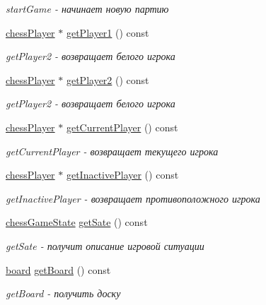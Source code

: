 \begin{DoxyCompactItemize}
\begin{DoxyCompactList}\small\item\em start\+Game -\/ начинает новую партию \end{DoxyCompactList}\item 
\hyperlink{classchess_player}{chess\+Player} $\ast$ \hyperlink{classchess_game_ae818720664a4aaaad9654c63ee138c39}{get\+Player1} () const 
\begin{DoxyCompactList}\small\item\em get\+Player2 -\/ возвращает белого игрока \end{DoxyCompactList}\item 
\hyperlink{classchess_player}{chess\+Player} $\ast$ \hyperlink{classchess_game_abe4bece4c525cd770a8b8c455cd2b462}{get\+Player2} () const 
\begin{DoxyCompactList}\small\item\em get\+Player2 -\/ возвращает белого игрока \end{DoxyCompactList}\item 
\hyperlink{classchess_player}{chess\+Player} $\ast$ \hyperlink{classchess_game_a1c5a201d0868ad9002b8e2ee1be8476f}{get\+Current\+Player} () const 
\begin{DoxyCompactList}\small\item\em get\+Current\+Player -\/ возвращает текущего игрока \end{DoxyCompactList}\item 
\hyperlink{classchess_player}{chess\+Player} $\ast$ \hyperlink{classchess_game_a3c7f8d99a70c6bc579e11c7a80498b20}{get\+Inactive\+Player} () const 
\begin{DoxyCompactList}\small\item\em get\+Inactive\+Player -\/ возвращает противоположного игрока \end{DoxyCompactList}\item 
\hyperlink{classchess_game_state}{chess\+Game\+State} \hyperlink{classchess_game_aa63acf0a17cc89fcc0e7535a369ebca2}{get\+Sate} () const 
\begin{DoxyCompactList}\small\item\em get\+Sate -\/ получит описание игровой ситуации \end{DoxyCompactList}\item 
\hyperlink{classboard}{board} \hyperlink{classchess_game_ab217741c1342afad766efdc680b46712}{get\+Board} () const 
\begin{DoxyCompactList}\small\item\em get\+Board -\/ получить доску \end{DoxyCompactList}\item 

\end{DoxyCompactItemize}
